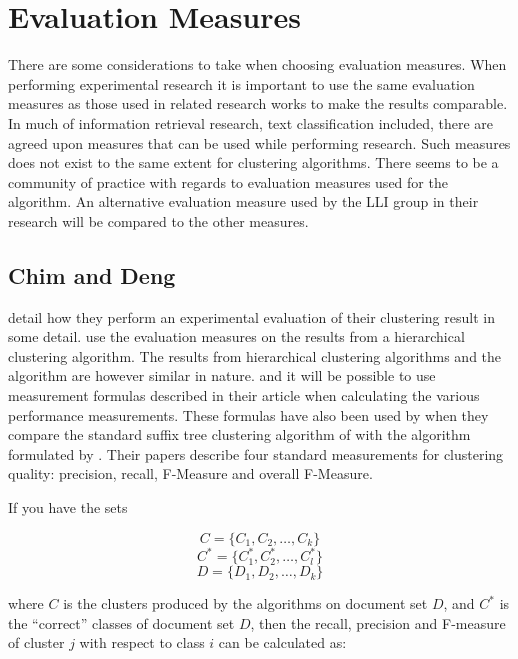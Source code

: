 \section{Evaluation Measures}
\label{EvaluationMeasures}
There are some considerations to take when choosing evaluation measures. When performing experimental research it is important to use the same evaluation measures as those used in related research works to make the results comparable. In much of information retrieval research, text classification included, there are agreed upon measures that can be used while performing research. Such measures does not exist to the same extent for clustering algorithms. There seems to be a community of practice with regards to evaluation measures used for the \STC algorithm. An alternative evaluation measure used by the LLI group in their research will be compared to the other measures.

\subsection{Chim and Deng}

\cite{Chim2007} detail how they perform an experimental evaluation of their clustering result in some detail. \citeauthor{Chim2007} use the evaluation measures on the results from a hierarchical clustering algorithm. The results from hierarchical clustering algorithms and the \CTC algorithm are however similar in nature. and it will be possible to use measurement formulas described in their article when calculating the various performance measurements. These formulas have also been used by \cite{Rafi2011} when they compare the standard suffix tree clustering algorithm of \citeauthor{Oren1998} with the algorithm formulated by \citeauthor{Chim2008}. Their papers describe four standard measurements for clustering quality: precision, recall, F-Measure and overall F-Measure.

If you have the sets

\begin{displaymath}
C = \{C_{1}, C_{2}, \dots, C_{k}\}
\end{displaymath}
\begin{displaymath}
C^* = \{C_1^*, C_2^*, \dots, C_l^*\}
\end{displaymath}
\begin{displaymath}
D = \{D_{1}, D_{2}, \dots, D_{k}\}
\end{displaymath}

where \(C\) is the clusters produced by the algorithms on document set \(D\), and \(C^*\) is the ``correct'' classes of document set \(D\), then the recall, precision and F-measure of cluster \(j\) with respect to class \(i\) can be calculated as:

